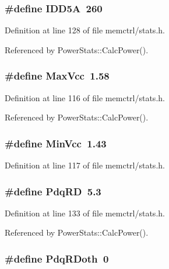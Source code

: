\subsubsection[{IDD5A}]{\setlength{\rightskip}{0pt plus 5cm}\#define IDD5A~260}\label{memctrl_2stats_8h_9735936760d8cad777efe3440d06fbdb}




Definition at line 128 of file memctrl/stats.h.

Referenced by PowerStats::CalcPower().
\subsubsection[{MaxVcc}]{\setlength{\rightskip}{0pt plus 5cm}\#define MaxVcc~1.58}\label{memctrl_2stats_8h_cd4bf9927ff09701b4569aac60226b2c}




Definition at line 116 of file memctrl/stats.h.

Referenced by PowerStats::CalcPower().
\subsubsection[{MinVcc}]{\setlength{\rightskip}{0pt plus 5cm}\#define MinVcc~1.43}\label{memctrl_2stats_8h_8a1ee7466c26ff3d55d3280a2cba349f}




Definition at line 117 of file memctrl/stats.h.
\subsubsection[{PdqRD}]{\setlength{\rightskip}{0pt plus 5cm}\#define PdqRD~5.3}\label{memctrl_2stats_8h_01782c77f87acc473332946016bf9896}




Definition at line 133 of file memctrl/stats.h.

Referenced by PowerStats::CalcPower().
\subsubsection[{PdqRDoth}]{\setlength{\rightskip}{0pt plus 5cm}\#define PdqRDoth~0}\label{memctrl_2stats_8h_5b3dbfa6218f120df64b2a07feffe5d1}





